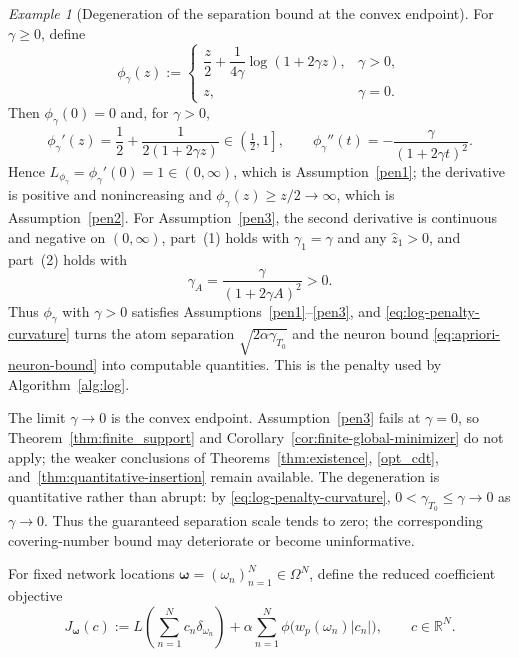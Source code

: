 \documentclass[11pt]{amsart}
\theoremstyle{definition}
\theoremstyle{remark}
\newtheorem{example}[theorem]{Example}
\begin{document}
\begin{example}[Degeneration of the separation bound at the convex endpoint]
\label{ex:log-penalty}
For $\gamma\ge0$, define
\begin{equation}
\label{eq:log-penalty}
	\phi_\gamma(z):=
	\begin{cases}
	\dfrac z2+\dfrac{1}{4\gamma}\log(1+2\gamma z),
	&\gamma>0,\\[6pt]
	z,&\gamma=0.
	\end{cases}
\end{equation}
Then $\phi_\gamma(0)=0$ and, for $\gamma>0$,
\begin{equation*}
	\phi_\gamma'(z)=\frac12+\frac{1}{2(1+2\gamma z)}\in\left(\tfrac12,1\right],
	\qquad
	\phi_\gamma''(t)=-\frac{\gamma}{(1+2\gamma t)^2}.
\end{equation*}
Hence $L_{\phi_\gamma}=\phi_\gamma'(0)=1\in(0,\infty)$, which is
Assumption~\ref{pen1}; the derivative is positive and nonincreasing and
$\phi_\gamma(z)\ge z/2\to\infty$, which is Assumption~\ref{pen2}. For
Assumption~\ref{pen3}, the second derivative is continuous and negative on
$(0,\infty)$, part~(1) holds with $\gamma_1=\gamma$ and any $\hat z_1>0$, and
part~(2) holds with
\begin{equation}
\label{eq:log-penalty-curvature}
	\gamma_A=\frac{\gamma}{(1+2\gamma A)^2}>0 .
\end{equation} 
Thus $\phi_\gamma$ with $\gamma>0$ satisfies
Assumptions~\ref{pen1}--\ref{pen3}, and \eqref{eq:log-penalty-curvature} turns
the atom separation $\sqrt{2\alpha\gamma_{T_0}}$ and the neuron bound
\eqref{eq:apriori-neuron-bound} into computable quantities. This is the
penalty used by Algorithm~\ref{alg:log}.

The limit $\gamma\to0$ is the convex endpoint. Assumption~\ref{pen3} fails at
$\gamma=0$, so Theorem~\ref{thm:finite_support} and
Corollary~\ref{cor:finite-global-minimizer} do not apply; the weaker
conclusions of Theorems~\ref{thm:existence}, \ref{opt_cdt},
and~\ref{thm:quantitative-insertion} remain available. The degeneration is
quantitative rather than abrupt: by \eqref{eq:log-penalty-curvature},
$0<\gamma_{T_0}\leq\gamma\to0$ as $\gamma\to0$. Thus the guaranteed
separation scale tends to zero; the corresponding covering-number
bound may deteriorate or become uninformative.
\end{example}

For fixed network locations
$\boldsymbol\omega=(\omega_n)_{n=1}^N\in\Omega^N$, define the reduced
coefficient objective
\begin{equation}
\label{eq:fixed-location-objective}
	J_{\boldsymbol\omega}(c)
	:=L\!\left(\sum_{n=1}^N c_n\delta_{\omega_n}\right)
	+\alpha\sum_{n=1}^N\phi\bigl(w_p(\omega_n)|c_n|\bigr),
	\qquad c\in\mathbb R^N.
\end{equation}
\end{document}

